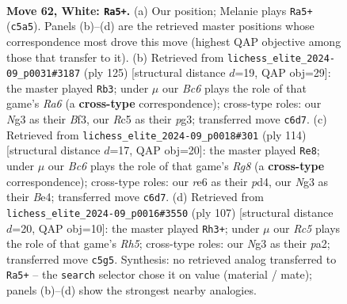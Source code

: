 \documentclass[11pt]{article}
\begin{document}
\clearpage

\begin{figure}[p]\centering
\begin{subfigure}{0.46\textwidth}\centering
\resizebox{\linewidth}{!}{%
\newchessgame
\chessboard[
  setfen={8/k7/2B1r3/2R5/1P3p2/6N1/6P1/1K6 w - - 0 62},
  showmover=false,
  pgfstyle=straightmove, color=movearrow, markmove={c5-a5}
]}
\caption{}
\end{subfigure}\hfill
\begin{subfigure}{0.46\textwidth}\centering
\resizebox{\linewidth}{!}{%
\newchessgame
\chessboard[
  setfen={8/8/4k3/7p/2PK4/r4bP1/5R2/2B5 b - - 16 63},
  showmover=false,
  pgfstyle=straightmove, color=movearrow, markmove={a3-b3}
]}
\caption{}
\end{subfigure}
\\[4pt]
\begin{subfigure}{0.46\textwidth}\centering
\resizebox{\linewidth}{!}{%
\newchessgame
\chessboard[
  setfen={6R1/8/8/7K/3pBr2/3P4/3k4/8 w - - 1 58},
  showmover=false,
  pgfstyle=straightmove, color=movearrow, markmove={g8-e8}
]}
\caption{}
\end{subfigure}\hfill
\begin{subfigure}{0.46\textwidth}\centering
\resizebox{\linewidth}{!}{%
\newchessgame
\chessboard[
  setfen={8/p2R4/5k2/1P5p/3b3r/5K2/P7/8 b - - 0 54},
  showmover=false,
  pgfstyle=straightmove, color=movearrow, markmove={h4-h3}
]}
\caption{}
\end{subfigure}
\caption{\textbf{Move 62, White: \texttt{Ra5+}.} (a) Our position; Melanie plays \texttt{Ra5+} (\texttt{c5a5}). Panels (b)--(d) are the retrieved master positions whose correspondence most drove this move (highest QAP objective among those that transfer to it). (b) Retrieved from \texttt{lichess\_elite\_2024-09\_p0031\#3187} (ply 125) [structural distance $d$=19, QAP obj=29]: the master played \texttt{Rb3}; under $\mu$ our \emph{Bc6} plays the role of that game's \emph{Ra6} (a \textbf{cross-type} correspondence); cross-type roles: our \emph{N}g3 as their \emph{B}f3, our \emph{R}c5 as their \emph{p}g3; transferred move \texttt{c6d7}. (c) Retrieved from \texttt{lichess\_elite\_2024-09\_p0018\#301} (ply 114) [structural distance $d$=17, QAP obj=20]: the master played \texttt{Re8}; under $\mu$ our \emph{Bc6} plays the role of that game's \emph{Rg8} (a \textbf{cross-type} correspondence); cross-type roles: our \emph{r}e6 as their \emph{p}d4, our \emph{N}g3 as their \emph{B}e4; transferred move \texttt{c6d7}. (d) Retrieved from \texttt{lichess\_elite\_2024-09\_p0016\#3550} (ply 107) [structural distance $d$=20, QAP obj=10]: the master played \texttt{Rh3+}; under $\mu$ our \emph{Rc5} plays the role of that game's \emph{Rh5}; cross-type roles: our \emph{N}g3 as their \emph{p}a2; transferred move \texttt{c5g5}. Synthesis: no retrieved analog transferred to \texttt{Ra5+} -- the \texttt{search} selector chose it on value (material / mate); panels (b)--(d) show the strongest nearby analogies.}
\label{fig:thought-m122}
\end{figure}
\end{document}
